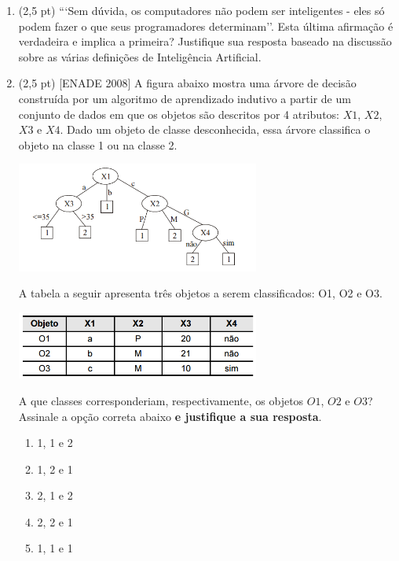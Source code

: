 \documentclass[12pt,a4paper,oneside]{article}
\begin{document}
\begin{enumerate}

	\item (2,5 pt) ```Sem dúvida, os computadores não podem ser inteligentes - eles só podem fazer o que seus programadores determinam''. Esta última afirmação é verdadeira e implica a primeira? Justifique sua resposta baseado na discussão sobre as várias definições de Inteligência Artificial.
		
	\item (2,5 pt) [ENADE 2008] A figura abaixo mostra uma árvore de decisão construída por um algoritmo de aprendizado indutivo a partir de um conjunto de dados em que os objetos são descritos por 4 atributos: $X1$, $X2$, $X3$ e $X4$. Dado um objeto de classe desconhecida, essa árvore classifica o objeto na classe 1 ou na classe 2. 

		\begin{center}
			\includegraphics[width=8cm]{images/enade01.png}
		\end{center}
	
		A tabela a seguir apresenta três objetos a serem classificados: O1, O2 e O3.
		
		\begin{center}
			\includegraphics[width=8cm]{images/enade02.png}
		\end{center}
		
		A que classes corresponderiam, respectivamente, os objetos $O1$, $O2$ e $O3$? Assinale a opção correta abaixo {\bf e justifique a sua resposta}.
	
		\begin{enumerate}
			\item 1, 1 e 2
			\item 1, 2 e 1
			\item 2, 1 e 2
			\item 2, 2 e 1
			\item 1, 1 e 1
		\end{enumerate}	
	

\end{enumerate}
\end{document}
